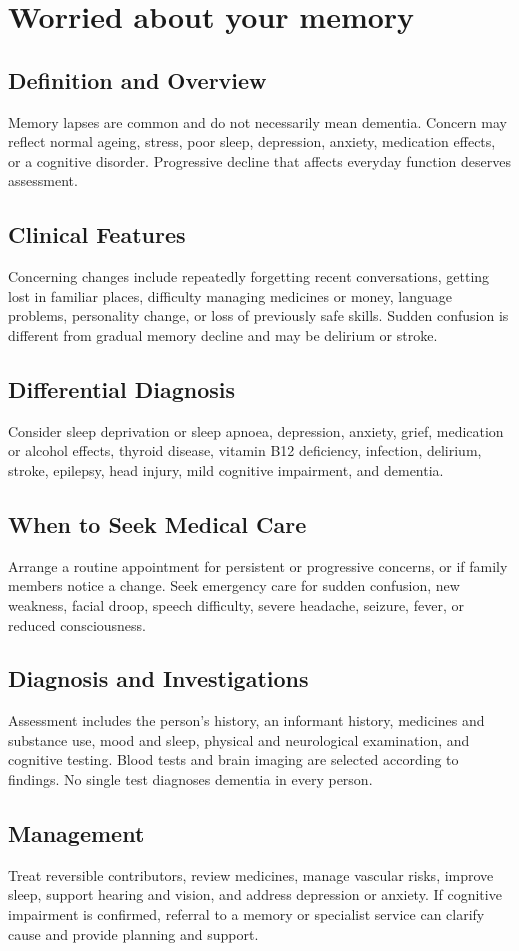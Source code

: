 \chapter{Worried about your memory}
\section*{Definition and Overview}
Memory lapses are common and do not necessarily mean dementia. Concern may reflect normal ageing, stress, poor sleep, depression, anxiety, medication effects, or a cognitive disorder. Progressive decline that affects everyday function deserves assessment.
\section*{Clinical Features}
Concerning changes include repeatedly forgetting recent conversations, getting lost in familiar places, difficulty managing medicines or money, language problems, personality change, or loss of previously safe skills. Sudden confusion is different from gradual memory decline and may be delirium or stroke.
\section*{Differential Diagnosis}
Consider sleep deprivation or sleep apnoea, depression, anxiety, grief, medication or alcohol effects, thyroid disease, vitamin B12 deficiency, infection, delirium, stroke, epilepsy, head injury, mild cognitive impairment, and dementia.
\section*{When to Seek Medical Care}
Arrange a routine appointment for persistent or progressive concerns, or if family members notice a change. Seek emergency care for sudden confusion, new weakness, facial droop, speech difficulty, severe headache, seizure, fever, or reduced consciousness.
\section*{Diagnosis and Investigations}
Assessment includes the person's history, an informant history, medicines and substance use, mood and sleep, physical and neurological examination, and cognitive testing. Blood tests and brain imaging are selected according to findings. No single test diagnoses dementia in every person.
\section*{Management}
Treat reversible contributors, review medicines, manage vascular risks, improve sleep, support hearing and vision, and address depression or anxiety. If cognitive impairment is confirmed, referral to a memory or specialist service can clarify cause and provide planning and support.
